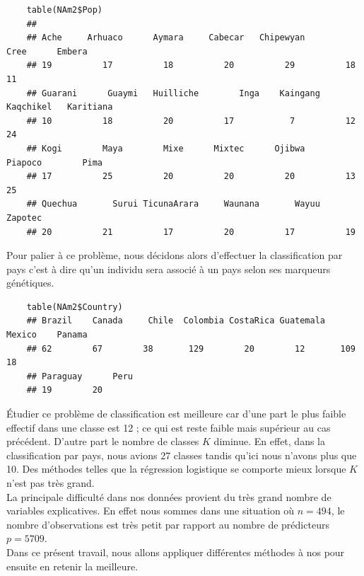 \documentclass[12pt,a4paper]{article}
\begin{document}
\begin{lstlisting}
	table(NAm2$Pop)
	##
	## Ache     Arhuaco      Aymara     Cabecar   Chipewyan        Cree      Embera 
	## 19          17          18          20          29          18          11 
	## Guarani      Guaymi   Huilliche        Inga    Kaingang   Kaqchikel   Karitiana 
	## 10          18          20          17           7          12          24 
	## Kogi        Maya        Mixe      Mixtec      Ojibwa     Piapoco        Pima 
	## 17          25          20          20          20          13          25 
	## Quechua       Surui TicunaArara     Waunana       Wayuu     Zapotec 
	## 20          21          17          20          17          19 
\end{lstlisting}
Pour palier à ce problème, nous décidons alors d'effectuer la classification par pays c'est à dire qu'un individu sera associé à un pays selon ses marqueurs génétiques. 
\vspace{2mm}
\begin{lstlisting}
	table(NAm2$Country)
	## Brazil    Canada     Chile  Colombia CostaRica Guatemala    Mexico    Panama 
	## 62        67        38       129        20        12       109        18 
	## Paraguay      Peru 
	## 19        20 
\end{lstlisting}
Étudier ce problème de classification est meilleure car d'une part le plus faible effectif dans une classe est 12 ; ce qui est reste faible mais supérieur au cas précédent. D'autre part le nombre de classes $K$ diminue. En effet, dans la classification par pays, nous avions 27 classes tandis qu'ici nous n'avons plus que 10. Des méthodes telles que la régression logistique se comporte mieux lorsque $K$ n'est pas très grand.\vspace{3mm}\\
La principale difficulté dans nos données provient du très grand nombre de variables explicatives. En effet nous sommes dans une situation où $n = 494$, le nombre d'observations est très petit par rapport au nombre de prédicteurs $p=5709$.\\
Dans ce présent travail, nous allons appliquer différentes méthodes à nos pour ensuite en retenir la meilleure.
\end{document}
